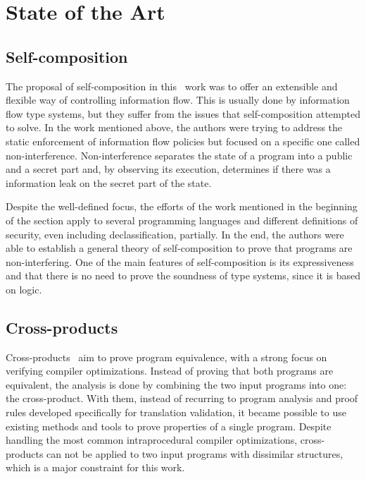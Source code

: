 
%

\makeatletter
\newcommand{\ntifpkgloaded}{%
  \@ifpackageloaded%
}
\makeatother


\chapter{State of the Art}
\label{cha:state_of_the_art}



\section{Self-composition} 
\label{sec:self_composition}

The proposal of self-composition in this~\cite{DBLP:conf/csfw/BartheDR04} work was to offer an extensible and flexible way of controlling information flow.
This is usually done by information flow type systems, but they suffer from the issues that self-composition attempted to solve.
In the work mentioned above, the authors were trying to address the static enforcement of information flow policies but focused on a specific one called non-interference.
Non-interference separates the state of a program into a public and a secret part and, by observing its execution, determines if there was a information leak on the secret part of the state.

Despite the well-defined focus, the efforts of the work mentioned in the beginning of the section apply to several programming languages and different definitions of security, even including declassification, partially.
In the end, the authors were able to establish a general theory of self-composition to prove that programs are non-interfering.
One of the main features of self-composition is its expressiveness and that there is no need to prove the soundness of type systems, since it is based on logic.


\section{Cross-products} 
\label{sec:cross_products}

Cross-products~\cite{DBLP:conf/fm/ZaksP08} aim to prove program equivalence, with a strong focus on verifying compiler optimizations.
Instead of proving that both programs are equivalent, the analysis is done by combining the two input programs into one: the cross-product.
With them, instead of recurring to program analysis and proof rules developed specifically for translation validation, it became possible to use existing methods and tools to prove properties of a single program. 
Despite handling the most common intraprocedural compiler optimizations, cross-products can not be applied to two input programs with dissimilar structures, which is a major constraint for this work.


